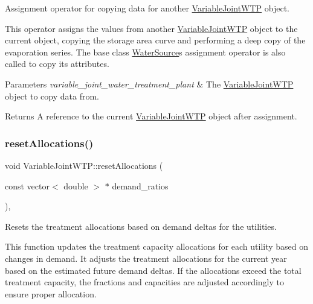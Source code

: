Assignment operator for copying data for another {\ttfamily \mbox{\hyperlink{classVariableJointWTP}{Variable\+Joint\+W\+TP}}} object. 

This operator assigns the values from another {\ttfamily \mbox{\hyperlink{classVariableJointWTP}{Variable\+Joint\+W\+TP}}} object to the current object, copying the storage area curve and performing a deep copy of the evaporation series. The base class {\ttfamily \mbox{\hyperlink{classWaterSource}{Water\+Source}}}\textquotesingle{}s assignment operator is also called to copy its attributes.


\begin{DoxyParams}{Parameters}
{\em variable\+\_\+joint\+\_\+water\+\_\+treatment\+\_\+plant} & The {\ttfamily \mbox{\hyperlink{classVariableJointWTP}{Variable\+Joint\+W\+TP}}} object to copy data from.\\
\hline
\end{DoxyParams}
\begin{DoxyReturn}{Returns}
A reference to the current {\ttfamily \mbox{\hyperlink{classVariableJointWTP}{Variable\+Joint\+W\+TP}}} object after assignment. 
\end{DoxyReturn}
\mbox{\label{classVariableJointWTP_ab02c6701ad5120e189023b038bae13b7}} 
\subsubsection{\texorpdfstring{reset\+Allocations()}{resetAllocations()}}
{\footnotesize\ttfamily void Variable\+Joint\+W\+T\+P\+::reset\+Allocations (\begin{DoxyParamCaption}\item[{const vector$<$ double $>$ $\ast$}]{demand\+\_\+ratios }\end{DoxyParamCaption})\hspace{0.3cm}{\ttfamily [override]}, {\ttfamily [virtual]}}



Resets the treatment allocations based on demand deltas for the utilities. 

This function updates the treatment capacity allocations for each utility based on changes in demand. It adjusts the treatment allocations for the current year based on the estimated future demand deltas. If the allocations exceed the total treatment capacity, the fractions and capacities are adjusted accordingly to ensure proper allocation.


